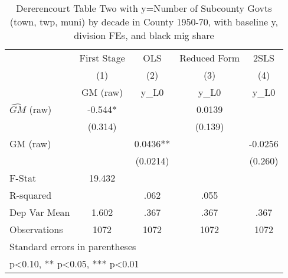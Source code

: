 \begin{table}[htbp]\centering
\def\sym#1{\ifmmode^{#1}\else\(^{#1}\)\fi}
\caption{Dererencourt Table Two with y=Number of Subcounty Govts (town, twp, muni) by decade in County 1950-70, with baseline y, division FEs, and black mig share}
\begin{tabular}{l*{4}{c}}
\toprule
                    & First Stage   &         OLS   &Reduced Form   &        2SLS   \\
                    &\multicolumn{1}{c}{(1)}&\multicolumn{1}{c}{(2)}&\multicolumn{1}{c}{(3)}&\multicolumn{1}{c}{(4)}\\
                    &\multicolumn{1}{c}{GM  (raw)}&\multicolumn{1}{c}{y\_L0}&\multicolumn{1}{c}{y\_L0}&\multicolumn{1}{c}{y\_L0}\\
\midrule
$\hat{GM}$ (raw)    &      -0.544*  &               &      0.0139   &               \\
                    &     (0.314)   &               &     (0.139)   &               \\
\addlinespace
GM  (raw)           &               &      0.0436** &               &     -0.0256   \\
                    &               &    (0.0214)   &               &     (0.260)   \\
\midrule
F-Stat              &      19.432   &               &               &               \\
R-squared           &               &        .062   &        .055   &               \\
Dep Var Mean        &       1.602   &        .367   &        .367   &        .367   \\
Observations        &        1072   &        1072   &        1072   &        1072   \\
\bottomrule
\multicolumn{5}{l}{\footnotesize Standard errors in parentheses}\\
\multicolumn{5}{l}{\footnotesize * p<0.10, ** p<0.05, *** p<0.01}\\
\end{tabular}
\end{table}
